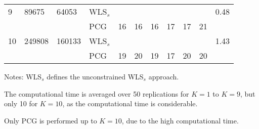 \documentclass[11pt]{article}
\newcommand{\0}{\phantom{0}}
\begin{document}
\begin{table}[ht]
\begin{threeparttable}
\begin{tabular}{llllrrrrrrr}
			\midrule
			9   & 89675  & 64053  & WLS$_{s}$ &                                            &     &           &           &     &     & 0.48           \\
			    &        &        & PCG       & 16                                         & 16  & 16        & 17        & 17  & 21  & \bm{$244.68$}  \\
			\midrule
			10  & 249808 & 160133 & WLS$_{s}$ &                                            &     &           &           &     &     & 1.43           \\
			    &        &        & PCG       & 19                                         & 20  & 19        & 17        & 20  & 20  & \bm{$1660.12$} \\
			\bottomrule
		\end{tabular}
		\begin{tablenotes}
			\item [] Notes: WLS$_{s}$ defines the unconstrained WLS$_{s}$ approach.
			\item [] The computational time is averaged over 50 replications for $K = 1$ to $K = 9$, but only 10 for $K = 10$, as the computational time is considerable.
			\item [] Only PCG is performed up to $K = 10$, due to the high computational time.
		\end{tablenotes}
	\end{threeparttable}
\end{table}
\end{document}

